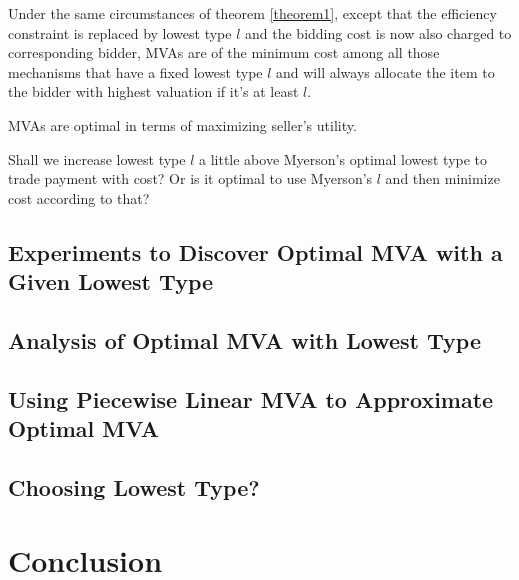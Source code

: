 \documentclass{aamas2012}
\begin{document}
\begin{theorem}

Under the same circumstances of theorem \ref{theorem1}, except that
the efficiency constraint is replaced by lowest type $l$ and the bidding cost is 
now also charged to corresponding bidder,
MVAs are of the minimum cost among all those mechanisms that have a fixed 
lowest type $l$ and will always allocate the item to the bidder 
with highest valuation if it's at least $l$.
\end{theorem}

\begin{corollary}
MVAs are optimal in terms of maximizing seller's utility.
\end{corollary}

\begin{corollary}
Shall we increase lowest type $l$ a little above Myerson's
optimal lowest type to trade payment with cost? Or is it optimal
to use Myerson's $l$ and then minimize cost according to that?
\end{corollary}

\subsection{Experiments to Discover Optimal MVA with a Given Lowest Type}

\subsection{Analysis of Optimal MVA with Lowest Type}

\subsection{Using Piecewise Linear MVA to Approximate Optimal MVA}

\subsection{Choosing Lowest Type?}

\section{Conclusion}
\end{document}
